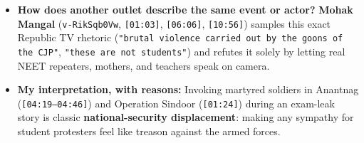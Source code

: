 \documentclass[10pt,a4paper]{article}
\begin{document}
\begin{itemize}[leftmargin=1.5em, itemsep=3pt, topsep=4pt]
  \item \textbf{How does another outlet describe the same event or actor?} \textbf{Mohak Mangal} (\texttt{v-RikSqb0Vw}, \texttt{[01:03]}, \texttt{[06:06]}, \texttt{[10:56]}) samples this exact Republic TV rhetoric (\texttt{"brutal violence carried out by the goons of the CJP"}, \texttt{"these are not students"}) and refutes it solely by letting real NEET repeaters, mothers, and teachers speak on camera.
  \item \textbf{My interpretation, with reasons:} Invoking martyred soldiers in Anantnag (\texttt{[04:19--04:46]}) and Operation Sindoor (\texttt{[01:24]}) during an exam-leak story is classic \textbf{national-security displacement}: making any sympathy for student protesters feel like treason against the armed forces.
\end{itemize}
\end{document}
